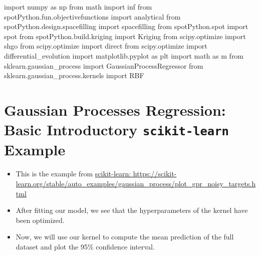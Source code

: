 \documentclass[
  letterpaper,
  DIV=11,
  numbers=noendperiod]{scrreprt}
\newenvironment{Shaded}{\begin{snugshade}}{\end{snugshade}}
\newcommand{\ImportTok}[1]{\textcolor[rgb]{0.00,0.46,0.62}{#1}}
\newcommand{\NormalTok}[1]{\textcolor[rgb]{0.00,0.23,0.31}{#1}}
\begin{document}
\begin{Shaded}
\begin{Highlighting}[]
\ImportTok{import}\NormalTok{ numpy }\ImportTok{as}\NormalTok{ np}
\ImportTok{from}\NormalTok{ math }\ImportTok{import}\NormalTok{ inf}
\ImportTok{from}\NormalTok{ spotPython.fun.objectivefunctions }\ImportTok{import}\NormalTok{ analytical}
\ImportTok{from}\NormalTok{ spotPython.design.spacefilling }\ImportTok{import}\NormalTok{ spacefilling}
\ImportTok{from}\NormalTok{ spotPython.spot }\ImportTok{import}\NormalTok{ spot}
\ImportTok{from}\NormalTok{ spotPython.build.kriging }\ImportTok{import}\NormalTok{ Kriging}
\ImportTok{from}\NormalTok{ scipy.optimize }\ImportTok{import}\NormalTok{ shgo}
\ImportTok{from}\NormalTok{ scipy.optimize }\ImportTok{import}\NormalTok{ direct}
\ImportTok{from}\NormalTok{ scipy.optimize }\ImportTok{import}\NormalTok{ differential\_evolution}
\ImportTok{import}\NormalTok{ matplotlib.pyplot }\ImportTok{as}\NormalTok{ plt}
\ImportTok{import}\NormalTok{ math }\ImportTok{as}\NormalTok{ m}
\ImportTok{from}\NormalTok{ sklearn.gaussian\_process }\ImportTok{import}\NormalTok{ GaussianProcessRegressor}
\ImportTok{from}\NormalTok{ sklearn.gaussian\_process.kernels }\ImportTok{import}\NormalTok{ RBF}
\end{Highlighting}
\end{Shaded}

\hypertarget{gaussian-processes-regression-basic-introductory-scikit-learn-example}{%
\section{\texorpdfstring{Gaussian Processes Regression: Basic
Introductory \texttt{scikit-learn}
Example}{Gaussian Processes Regression: Basic Introductory scikit-learn Example}}\label{gaussian-processes-regression-basic-introductory-scikit-learn-example}}

\begin{itemize}
\item
  This is the example from
  \href{https://scikit-learn.org/stable/auto_examples/gaussian_process/plot_gpr_noisy_targets.html}{scikit-learn:
  https://scikit-learn.org/stable/auto\_examples/gaussian\_process/plot\_gpr\_noisy\_targets.html}
\item
  After fitting our model, we see that the hyperparameters of the kernel
  have been optimized.
\item
  Now, we will use our kernel to compute the mean prediction of the full
  dataset and plot the 95\% confidence interval.
\end{itemize}
\end{document}
